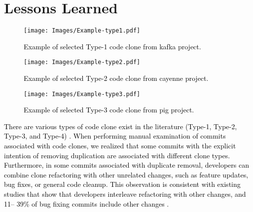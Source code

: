 \section{Lessons Learned}
\label{Section:lesson}


\begin{figure*}[htbp]
\centering 
\texttt{[image: Images/Example-type1.pdf]}
\caption{\textcolor{black}{Example of selected Type-1 code clone from kafka project.}} %
\label{fig:example-casestudies-type1}
\end{figure*}

 \begin{figure*}[htbp]
\centering 
 \texttt{[image: Images/Example-type2.pdf]}
 \caption{\textcolor{black}{Example of selected Type-2 code clone from cayenne project.}} %
 \label{fig:example-casestudies-type2}
\end{figure*}

\begin{figure*}[htbp]
\centering 
\texttt{[image: Images/Example-type3.pdf]}
\caption{\textcolor{black}{Example of selected Type-3 code clone from pig project.}} %
\label{fig:example-casestudies-type3}
\end{figure*}

\noindent{\textbf{ \textcolor{black}{Lesson 1: Code clones associated with commits about duplicate removal are from different clone types.}}}  \textcolor{black}{There are various types of code clone exist in the literature (\ie Type-1, Type-2, Type-3, and Type-4) \citep{mondal2020survey}. When performing manual examination of commits associated with code clones, we realized that some commits with the explicit intention of removing duplication are associated with different clone types. Furthermore, in some commits associated with duplicate removal, developers can combine clone refactoring with other unrelated changes, such as feature updates, bug fixes, or general code cleanup. This observation is consistent with existing studies that show that developers interleave refactoring with other changes, and 11– 39\% of bug fixing commits include other changes \cite{silva2016we,alomar2021we,murphy2012we,nguyen2013filtering}.}



